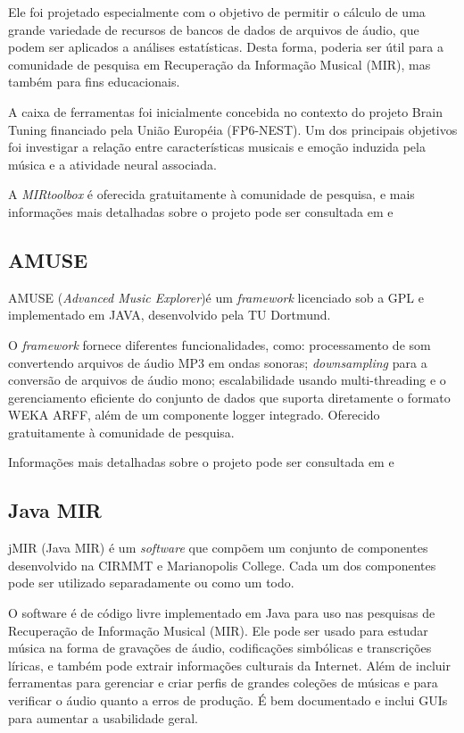 Ele foi projetado especialmente com o objetivo de permitir o cálculo de uma grande variedade de recursos de bancos de dados de arquivos de áudio, que podem ser aplicados a análises estatísticas. Desta forma, poderia ser útil para a comunidade de pesquisa em Recuperação da Informação Musical (MIR), mas também para fins educacionais.

A caixa de ferramentas foi inicialmente concebida no contexto do projeto Brain Tuning financiado pela União Européia (FP6-NEST). Um dos principais objetivos foi investigar a relação entre características musicais e emoção induzida pela música e a atividade neural associada.

A \textit{MIRtoolbox} é oferecida gratuitamente à comunidade de pesquisa, e mais informações mais detalhadas sobre o projeto pode ser consultada em \cite{lartillot2007} e \cite{mirtoolbox}

\subsection{AMUSE}
AMUSE (\textit{Advanced Music Explorer})é um \textit{framework} licenciado sob a GPL e implementado em JAVA, desenvolvido pela TU Dortmund.

O \textit{framework} fornece diferentes funcionalidades, como: processamento de som convertendo arquivos de áudio MP3 em ondas sonoras; \textit{downsampling} para a conversão de arquivos de áudio mono; escalabilidade usando multi-threading e o gerenciamento eficiente do conjunto de dados que suporta diretamente o formato WEKA ARFF, além de um componente logger integrado. Oferecido gratuitamente à comunidade de pesquisa.

Informações mais detalhadas sobre o projeto pode ser consultada em \cite{vatolkin2010} e \cite{amuse}

\subsection{Java MIR}
jMIR (Java MIR) é um \textit{software} que compõem um conjunto de componentes desenvolvido na CIRMMT e Marianopolis College. Cada um dos componentes pode ser utilizado separadamente ou como um todo.

O software é de código livre implementado em Java para uso nas pesquisas de Recuperação de Informação Musical (MIR). Ele pode ser usado para estudar música na forma de gravações de áudio, codificações simbólicas e transcrições líricas, e também pode extrair informações culturais da Internet. Além de incluir ferramentas para gerenciar e criar perfis de grandes coleções de músicas e para verificar o áudio quanto a erros de produção. É bem documentado e inclui GUIs para aumentar a usabilidade geral.


